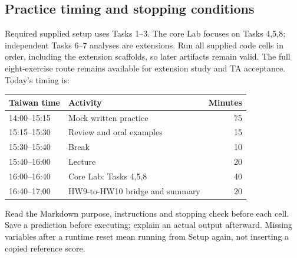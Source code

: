 \subsection{Practice timing and stopping conditions}
Required supplied setup uses Tasks 1--3. The core Lab focuses on Tasks 4,5,8; independent Tasks 6--7 analyses are extensions. Run all supplied code cells in order, including the extension scaffolds, so later artifacts remain valid. The full eight-exercise route remains available for extension study and TA acceptance. Today's timing is:
\begin{center}\begin{tabular}{llr}\toprule Taiwan time & Activity & Minutes\\\midrule
14:00--15:15 & Mock written practice &75\\
15:15--15:30 & Review and oral examples &15\\
15:30--15:40 & Break &10\\
15:40--16:00 & Lecture &20\\
16:00--16:40 & Core Lab: Tasks 4,5,8 &40\\
16:40--17:00 & HW9-to-HW10 bridge and summary &20\\\bottomrule
\end{tabular}\end{center}
Read the Markdown purpose, instructions and stopping check before each cell. Save a prediction before executing; explain an actual output afterward. Missing variables after a runtime reset mean running from Setup again, not inserting a copied reference score.

